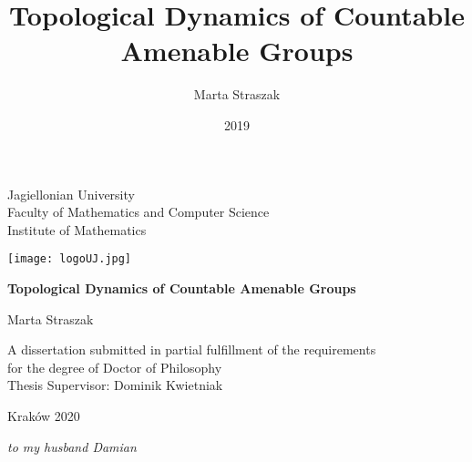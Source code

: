 \documentclass[10pt, a4paper, twoside,openright]{report}
\title{Topological Dynamics of Countable Amenable Groups}
\author{Marta Straszak}
\date{2019}
\begin{document}
\begin{titlepage}
\thispagestyle{empty}
\begin{center}
\textsf{\large Jagiellonian University\\Faculty of Mathematics and Computer Science\\Institute of Mathematics}
\vspace{5ex}%

\texttt{[image: logoUJ.jpg]}
\vfill%


{\textbf{\fontsize{20}{30}\selectfont   Topological Dynamics of Countable Amenable Groups\\}}
\vspace{5ex}%

\textsf{\Large Marta Straszak\\}
\vfill%
\vspace{5ex}

{\large A dissertation submitted in partial fulfillment of the requirements }\\
\vspace{1ex}
{\large for the degree of Doctor of Philosophy}\\
\vspace{3ex}
{\large Thesis Supervisor: Dominik Kwietniak}\\

\vfill\vfill%
\vfill\vfill%


\textsf{{\large Kraków 2020}}
\end{center}
\end{titlepage}

\cleardoublepage
\thispagestyle{empty}
\vspace*{0.2\textheight}
\begin{flushright}
  {\it%
    to my husband Damian \\[1em]

  }
\end{flushright}
\vfill




\begin{abstract}


\end{abstract}

\tableofcontents{}
	











\end{document}
